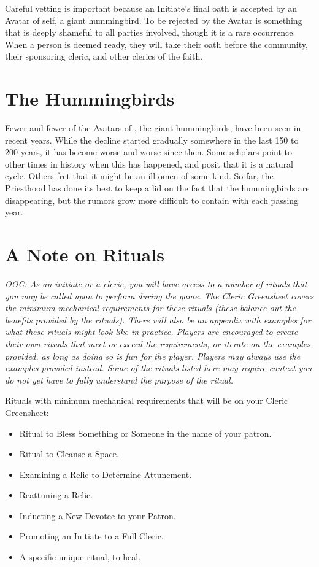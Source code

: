 \documentclass[blue]{GL2020}
\begin{document}
Careful vetting is important because an Initiate’s final oath is accepted by an Avatar of \cFarmGod{} \cFarmGod{\them}self, a giant hummingbird. To be rejected by the Avatar is something that is deeply shameful to all parties involved, though it is a rare occurrence. When a person is deemed ready, they will take their oath before the community, their sponsoring cleric, and other clerics of the faith.

\section*{The Hummingbirds}
Fewer and fewer of the Avatars of \cFarmGod{}, the giant hummingbirds, have been seen in recent years.  While the decline started gradually somewhere in the last 150 to 200 years, it has become worse and worse since then. Some scholars point to other times in history when this has happened, and posit that it is a natural cycle. Others fret that it might be an ill omen of some kind. So far, the Priesthood has done its best to keep a lid on the fact that the hummingbirds are disappearing, but the rumors grow more difficult to contain with each passing year.

\section*{A Note on Rituals}

\emph{OOC: As an initiate or a cleric, you will have access to a number of rituals that you may be called upon to perform during the game. The Cleric Greensheet covers the minimum mechanical requirements for these rituals (these balance out the benefits provided by the rituals). There will also be an appendix with examples for what these rituals might look like in practice. Players are encouraged to create their own rituals that meet or exceed the requirements, or iterate on the examples provided, as long as doing so is fun for the player. Players may always use the examples provided instead. Some of the rituals listed here may require context you do not yet have to fully understand the purpose of the ritual.}

Rituals with minimum mechanical requirements that will be on your Cleric Greensheet:
\begin{itemize}
  \item Ritual to Bless Something or Someone in the name of your patron.
  \item Ritual to Cleanse a Space.
  \item Examining a Relic to Determine Attunement.
  \item Reattuning a Relic.
  \item Inducting a New Devotee to your Patron.
  \item Promoting an Initiate to a Full Cleric.
  \item A \pFarm{} specific unique ritual, to heal.
\end{itemize}
\end{document}
